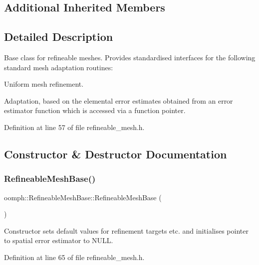 \subsection*{Additional Inherited Members}


\subsection{Detailed Description}
Base class for refineable meshes. Provides standardised interfaces for the following standard mesh adaptation routines\+:
\begin{DoxyItemize}
\item Uniform mesh refinement.
\item Adaptation, based on the elemental error estimates obtained from an error estimator function which is accessed via a function pointer. 
\end{DoxyItemize}

Definition at line 57 of file refineable\+\_\+mesh.\+h.



\subsection{Constructor \& Destructor Documentation}
\mbox{\label{classoomph_1_1RefineableMeshBase_a2b6e95347d4ffcc916c3d760f6e94a89}} 
\subsubsection{\texorpdfstring{Refineable\+Mesh\+Base()}{RefineableMeshBase()}\hspace{0.1cm}{\footnotesize\ttfamily [1/2]}}
{\footnotesize\ttfamily oomph\+::\+Refineable\+Mesh\+Base\+::\+Refineable\+Mesh\+Base (\begin{DoxyParamCaption}{ }\end{DoxyParamCaption})\hspace{0.3cm}{\ttfamily [inline]}}

Constructor sets default values for refinement targets etc. and initialises pointer to spatial error estimator to N\+U\+LL. 

Definition at line 65 of file refineable\+\_\+mesh.\+h.



